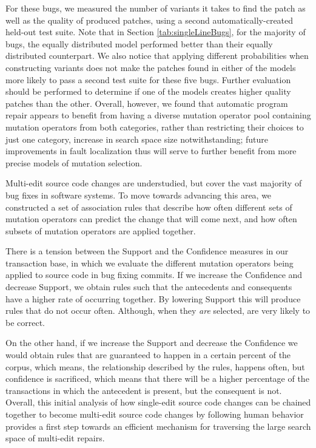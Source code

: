 \documentclass[conference]{IEEEtran}
\begin{document}
For these bugs, we measured the number of variants it takes to find the 
patch as well as the quality of produced patches, using a second automatically-created held-out test suite.
Note that in Section \ref{tab:singleLineBugs}, for the majority of bugs, the equally distributed model performed better than their equally distributed counterpart.
We also notice that applying different probabilities when constructing variants
does not make the patches found in either of the models more likely to pass a
second test suite for these five bugs. Further evaluation should be performed to
determine if one of the models creates higher quality patches than the other. 
Overall, however, we found that automatic program repair appears to benefit
from having a diverse mutation operator pool containing mutation operators from both categories,
rather than restricting their choices to just one category, increase in search
space size notwithstanding; future improvements in fault localization thus will
serve to further benefit from more precise models of mutation selection. 

Multi-edit source code changes are understudied, but cover
the vast majority of bug fixes in software systems. 
To move towards advancing this area, we constructed a set of association rules that describe 
how often different sets of mutation operators can predict the change that will 
come next, and how often subsets of mutation operators are applied together.

There is a tension between the Support and the Confidence measures in our transaction 
base, in which we 
evaluate the different mutation operators being applied to source code in bug 
fixing commits. 
If we increase the Confidence and decrease Support, we obtain rules such that
the antecedents and consequents have a higher rate of occurring together. By lowering Support this will produce rules that
do not occur often.  Although, when they \emph{are} selected, are very likely to be
correct. 

On the other hand, if 
we increase the Support and decrease the Confidence we would obtain rules that 
are guaranteed to happen in a certain percent of the corpus, which means,
the relationship described by the rules, happens often, but confidence is 
sacrificed, which means that there will be a higher percentage of the 
transactions in which the antecedent is present, but the consequent is not. 
Overall, this initial analysis of how single-edit source code changes can be chained together 
to become multi-edit source code changes by following human behavior provides a
first step towards an efficient mechanism for traversing the large search space
of multi-edit repairs.
\end{document}
